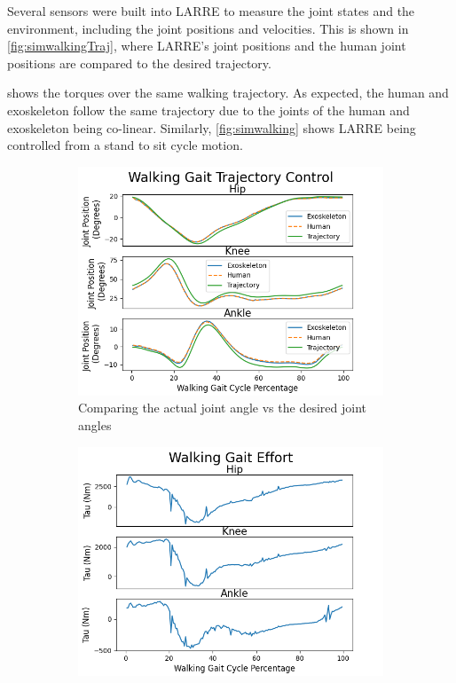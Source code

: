  
 Several sensors were built into LARRE to measure the joint states and the environment, including the joint positions and velocities. This is shown in \autoref{fig:simwalkingTraj}, where LARRE's joint positions and the human joint positions are compared to the desired trajectory.  \author{fig:simwalkingtorque} shows the torques over the same walking trajectory. As expected, the human and exoskeleton follow the same trajectory due to the joints of the human and exoskeleton being co-linear.  Similarly, \autoref{fig:simwalking} shows LARRE being controlled from a stand to sit cycle motion.
 
 
 \begin{figure}[h!]
    \begin{subfigure}{0.5\textwidth}
        \centering
        \includegraphics[scale=.5]{images/sim/walkjoints.png}
        \caption{Comparing the actual joint angle vs the desired joint angles}
        \label{fig:simwalkingTraj}
    \end{subfigure}
    \begin{subfigure}{0.5\textwidth}
        \centering
        \includegraphics[scale=.5]{images/sim/walktau.png}

\end{subfigure}
\end{figure}
